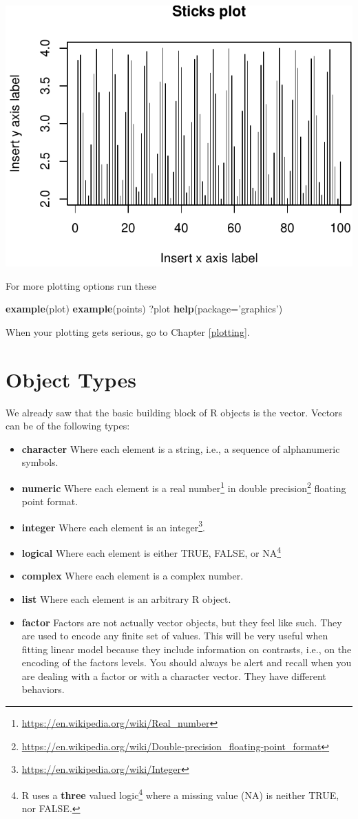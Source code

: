 \documentclass[]{book}
\newenvironment{Shaded}{\begin{snugshade}}{\end{snugshade}}
\newcommand{\DataTypeTok}[1]{\textcolor[rgb]{0.13,0.29,0.53}{#1}}
\newcommand{\KeywordTok}[1]{\textcolor[rgb]{0.13,0.29,0.53}{\textbf{#1}}}
\newcommand{\NormalTok}[1]{#1}
\newcommand{\StringTok}[1]{\textcolor[rgb]{0.31,0.60,0.02}{#1}}
\providecommand{\tightlist}{%
  \setlength{\itemsep}{0pt}\setlength{\parskip}{0pt}}
\renewcommand{\href}[2]{#2\footnote{\url{#1}}}
\theoremstyle{definition}
\theoremstyle{definition}
\theoremstyle{definition}
\theoremstyle{remark}
\begin{document}
\includegraphics[width=0.5\linewidth]{Rcourse_files/figure-latex/unnamed-chunk-35-1}

For more plotting options run these

\begin{Shaded}
\begin{Highlighting}[]
\KeywordTok{example}\NormalTok{(plot)}
\KeywordTok{example}\NormalTok{(points)}
\NormalTok{?plot}
\KeywordTok{help}\NormalTok{(}\DataTypeTok{package=}\StringTok{'graphics'}\NormalTok{)}
\end{Highlighting}
\end{Shaded}

When your plotting gets serious, go to Chapter \ref{plotting}.

\hypertarget{object-types}{%
\section{Object Types}\label{object-types}}

We already saw that the basic building block of R objects is the vector.
Vectors can be of the following types:

\begin{itemize}
\tightlist
\item
  \textbf{character} Where each element is a string, i.e., a sequence of alphanumeric symbols.
\item
  \textbf{numeric} Where each element is a \href{https://en.wikipedia.org/wiki/Real_number}{real number} in \href{https://en.wikipedia.org/wiki/Double-precision_floating-point_format}{double precision} floating point format.
\item
  \textbf{integer} Where each element is an \href{https://en.wikipedia.org/wiki/Integer}{integer}.
\item
  \textbf{logical} Where each element is either TRUE, FALSE, or NA\footnote{R uses a \href{https://en.wikipedia.org/wiki/Three-valued_logic}{\textbf{three} valued logic} where a missing value (NA) is neither TRUE, nor FALSE.}
\item
  \textbf{complex} Where each element is a complex number.
\item
  \textbf{list} Where each element is an arbitrary R object.
\item
  \textbf{factor} Factors are not actually vector objects, but they feel like such.
  They are used to encode any finite set of values.
  This will be very useful when fitting linear model because they include information on contrasts, i.e., on the encoding of the factors levels.
  You should always be alert and recall when you are dealing with a factor or with a character vector. They have different behaviors.
\end{itemize}
\end{document}
